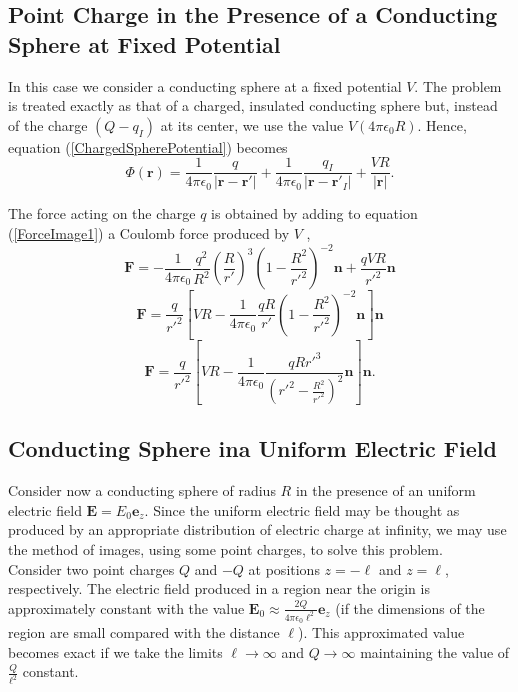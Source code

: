 \subsection{Point Charge in the Presence of a Conducting Sphere at Fixed Potential}
In this case we consider a conducting sphere at a fixed potential $V$. The problem is treated exactly as that of a charged, insulated conducting sphere but, instead of the charge $(Q-q_I)$ at its center, we use the value $V (4\pi \epsilon_0 R)$. Hence, equation (\ref{ChargedSpherePotential})  becomes
\begin{equation}
\Phi (\textbf{r}) = \frac{1}{4\pi \epsilon_0} \frac{q}{\left| \textbf{r} - \textbf{r}' \right|} + \frac{1}{4\pi \epsilon_0} \frac{q_I}{\left| \textbf{r} - \textbf{r}'_I \right|} +  \frac{V R}{\left| \textbf{r} \right|}.
\end{equation}

The force acting on the charge $q$ is obtained by adding to equation (\ref{ForceImage1}) a Coulomb force produced by $V$ , 
\begin{equation}
\textbf{F} = -\frac{1}{4\pi \epsilon_0} \frac{q^2}{R^2}  \left( \frac{R}{r'}  \right)^3 \left( 1 - \frac{R^2}{r'^2}\right)^{-2} \textbf{n} +  \frac{qVR}{r'^2} \textbf{n}
\end{equation}
\begin{equation}
\textbf{F} =\frac{q}{r'^2} \left[ VR -\frac{1}{4\pi \epsilon_0} \frac{qR}{r'}  \left( 1 - \frac{R^2}{r'^2}\right)^{-2} \textbf{n} \right] \textbf{n}
\end{equation}
\begin{equation}
\textbf{F} =\frac{q}{r'^2} \left[ VR -\frac{1}{4\pi \epsilon_0} \frac{qRr'^3}{ \left( r'^2 - \frac{R^2}{r'^2}\right)^2}  \textbf{n} \right] \textbf{n} .
\end{equation}

\subsection{Conducting Sphere ina Uniform Electric Field}
Consider now a conducting sphere of radius $R$ in the presence of an uniform electric field $\textbf{E} = E_0 \textbf{e}_z$. Since the uniform electric field may be thought as produced by an appropriate distribution of electric charge at infinity, we may use the method of images, using some point charges, to solve this problem.\\

Consider two point charges $Q$ and $-Q$ at positions $z=-\ell$ and $z=\ell$, respectively. The electric field produced in a region near the origin is approximately constant with the value $\textbf{E}_0 \approx \frac{2Q}{4\pi \epsilon_0 \ell^2} \textbf{e}_z$ (if the dimensions of the region are small compared with the distance $\ell$). This approximated value becomes exact if we take the limits $\ell \rightarrow \infty$ and $Q \rightarrow \infty$ maintaining the value of $\frac{Q}{\ell^2}$ constant.\\

